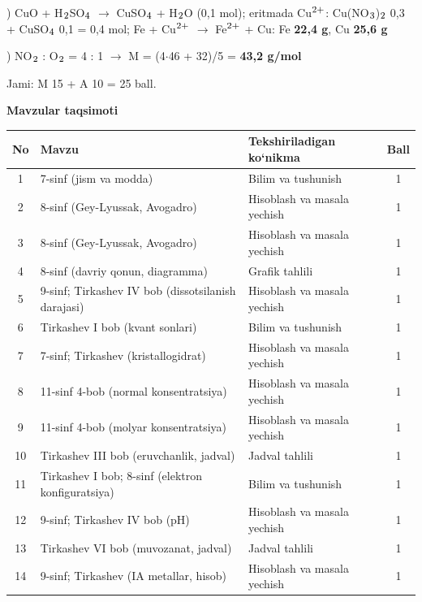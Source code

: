 \documentclass[11pt,a4paper]{article}
\renewcommand{\textsubscript}[1]{\ensuremath{_{\text{\fontsize{8}{8}\selectfont #1}}}}
\renewcommand{\textsuperscript}[1]{\ensuremath{^{\text{\fontsize{8}{8}\selectfont #1}}}}
\begin{document}
) CuO + H\textsubscript{2}SO\textsubscript{4} $\to$ CuSO\textsubscript{4} + H\textsubscript{2}O (0,1 mol); eritmada Cu\textsuperscript{2+}: Cu(NO\textsubscript{3})\textsubscript{2} 0,3 + CuSO\textsubscript{4} 0,1 = 0,4 mol; Fe + Cu\textsuperscript{2+} $\to$ Fe\textsuperscript{2+} + Cu: Fe \textbf{22,4 g}, Cu \textbf{25,6 g}\par
{}) NO\textsubscript{2} : O\textsubscript{2} = 4 : 1 $\to$ M = (4$\cdot$46 + 32)/5 = \textbf{43,2 g/mol}\par
\noindent Jami: M 15 + A 10 = 25 ball.\par
\par\bigskip\noindent\textbf{Mavzular taqsimoti}\par\smallskip
{\small\noindent\begin{longtable}{|c|p{7.2cm}|p{5.4cm}|c|}\hline \textbf{No} & \textbf{Mavzu} & \textbf{Tekshiriladigan ko`nikma} & \textbf{Ball}\\\hline
1 & 7-sinf (jism va modda) & Bilim va tushunish & 1\\\hline
2 & 8-sinf (Gey-Lyussak, Avogadro) & Hisoblash va masala yechish & 1\\\hline
3 & 8-sinf (Gey-Lyussak, Avogadro) & Hisoblash va masala yechish & 1\\\hline
4 & 8-sinf (davriy qonun, diagramma) & Grafik tahlili & 1\\\hline
5 & 9-sinf; Tirkashev IV bob (dissotsilanish darajasi) & Hisoblash va masala yechish & 1\\\hline
6 & Tirkashev I bob (kvant sonlari) & Bilim va tushunish & 1\\\hline
7 & 7-sinf; Tirkashev (kristallogidrat) & Hisoblash va masala yechish & 1\\\hline
8 & 11-sinf 4-bob (normal konsentratsiya) & Hisoblash va masala yechish & 1\\\hline
9 & 11-sinf 4-bob (molyar konsentratsiya) & Hisoblash va masala yechish & 1\\\hline
10 & Tirkashev III bob (eruvchanlik, jadval) & Jadval tahlili & 1\\\hline
11 & Tirkashev I bob; 8-sinf (elektron konfiguratsiya) & Bilim va tushunish & 1\\\hline
12 & 9-sinf; Tirkashev IV bob (pH) & Hisoblash va masala yechish & 1\\\hline
13 & Tirkashev VI bob (muvozanat, jadval) & Jadval tahlili & 1\\\hline
14 & 9-sinf; Tirkashev (IA metallar, hisob) & Hisoblash va masala yechish & 1\\\hline

\end{longtable}}
\end{document}
